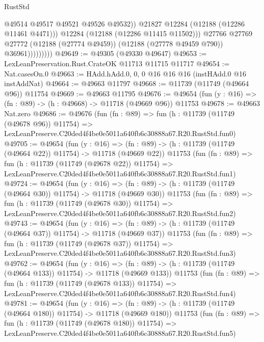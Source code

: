 \begin{lexlean}{RustStd}
\begin{coremodule}
                              @49514
                              @49517
                              @49521
                              @49526
                              @49532))
                          @21827
                          @12284
                          (@12188 (@12286 @11461 @4471)))
                        @12284
                        (@12188 (@12286 @11415 @11502)))
                      @27766
                      @27769
                      @27772
                      (@12188 (@27774 @49459))
                      (@12188 (@27778 @49459 @790))
                      @36961)))))))))
@49649 := @49305 (@49330 @49647)
@49653 := LexLeanPreservation.Rust.CrateOK @11713 @11715 @11717
@49654 := Nat.casesOn.{0}
@49663 := HAdd.hAdd.{0, 0, 0} @16 @16 @16 (instHAdd.{0} @16 instAddNat)
@49664 := @49663 @11797
@49668 := @11739 (@11749 (@49664 @96)) @11754
@49669 := @49663 @11795
@49676 := @49654 (fun (y : @16) => (fn : @89) -> (h : @49668) -> @11718 (@49669 @96)) @11753
@49678 := @49663 Nat.zero
@49686 := @49676
    (fun (fn : @89) =>
    fun (h : @11739 (@11749 (@49678 @96)) @11754) =>
    LexLeanPreserve.C20ded4f4be0e5011a640fb6c30888a67.R20.RustStd.fun0)
@49705 := @49654
    (fun (y : @16) =>
    (fn : @89) -> (h : @11739 (@11749 (@49664 @22)) @11754) -> @11718 (@49669 @22))
    @11753
    (fun (fn : @89) =>
    fun (h : @11739 (@11749 (@49678 @22)) @11754) =>
    LexLeanPreserve.C20ded4f4be0e5011a640fb6c30888a67.R20.RustStd.fun1)
@49724 := @49654
    (fun (y : @16) =>
    (fn : @89) -> (h : @11739 (@11749 (@49664 @30)) @11754) -> @11718 (@49669 @30))
    @11753
    (fun (fn : @89) =>
    fun (h : @11739 (@11749 (@49678 @30)) @11754) =>
    LexLeanPreserve.C20ded4f4be0e5011a640fb6c30888a67.R20.RustStd.fun2)
@49743 := @49654
    (fun (y : @16) =>
    (fn : @89) -> (h : @11739 (@11749 (@49664 @37)) @11754) -> @11718 (@49669 @37))
    @11753
    (fun (fn : @89) =>
    fun (h : @11739 (@11749 (@49678 @37)) @11754) =>
    LexLeanPreserve.C20ded4f4be0e5011a640fb6c30888a67.R20.RustStd.fun3)
@49762 := @49654
    (fun (y : @16) =>
    (fn : @89) -> (h : @11739 (@11749 (@49664 @133)) @11754) -> @11718 (@49669 @133))
    @11753
    (fun (fn : @89) =>
    fun (h : @11739 (@11749 (@49678 @133)) @11754) =>
    LexLeanPreserve.C20ded4f4be0e5011a640fb6c30888a67.R20.RustStd.fun4)
@49781 := @49654
    (fun (y : @16) =>
    (fn : @89) -> (h : @11739 (@11749 (@49664 @180)) @11754) -> @11718 (@49669 @180))
    @11753
    (fun (fn : @89) =>
    fun (h : @11739 (@11749 (@49678 @180)) @11754) =>
    LexLeanPreserve.C20ded4f4be0e5011a640fb6c30888a67.R20.RustStd.fun5)

\end{coremodule}
\end{lexlean}
